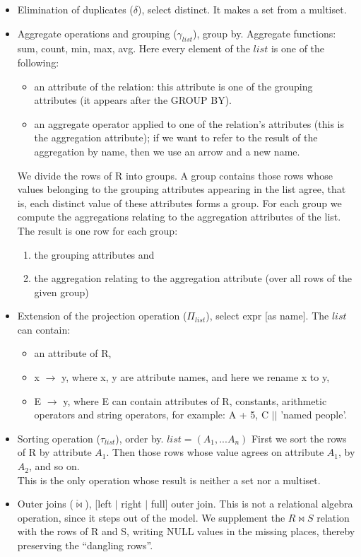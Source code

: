 \documentclass[margin=0px]{article}
\begin{document}
\begin{itemize}
    \item Elimination of duplicates ($\delta$), select distinct. It makes a set from a multiset.
    \item Aggregate operations and grouping ($\gamma_{list}$), group by. Aggregate functions: sum, count, min, max, avg. Here every element of the $list$ is one of the following:
          \begin{itemize}
              \item an attribute of the relation: this attribute is one of the grouping attributes (it appears after the GROUP BY).
              \item an aggregate operator applied to one of the relation's attributes (this is the aggregation attribute); if we want to refer to the result of the aggregation by name, then we use an arrow and a new name.
          \end{itemize}
          We divide the rows of R into groups. A group contains those rows whose values belonging to the grouping
          attributes appearing in the list agree, that is, each distinct value of these attributes forms a group. For each group we compute the aggregations relating to the aggregation attributes of the list. The result is one row for each group:
          \begin{enumerate}
              \item the grouping attributes and
              \item the aggregation relating to the aggregation attribute (over all rows of the given group)
          \end{enumerate}
    \item Extension of the projection operation ($\Pi_{list}$), select expr [as name]. The $list$ can contain:
          \begin{itemize}
              \item an attribute of R,
              \item x $\to$ y, where x, y are attribute names, and here we rename x to y,
              \item E $\to$ y, where E can contain attributes of R, constants, arithmetic operators and string operators, for example: A + 5, C $||$ 'named people'.
          \end{itemize}
    \item Sorting operation ($\tau_{list}$), order by. $list = (A_1,...A_n)$ First we sort the rows of R by attribute $A_1$. Then those rows whose value agrees on attribute $A_1$, by $A_2$, and so on. \\
          This is the only operation whose result is neither a set nor a multiset.
    \item Outer joins ($\mathring{\bowtie}$), [left $|$ right $|$ full] outer join. This is not a relational algebra operation, since it steps out of the model. We supplement the $R \bowtie S$ relation with the rows of R and S, writing NULL values in the missing places, thereby preserving the ``dangling rows''.
\end{itemize}
\end{document}
